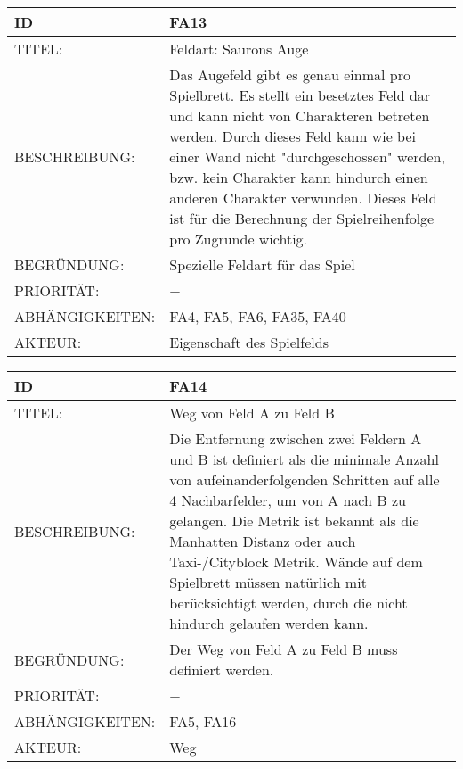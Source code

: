 \documentclass{uulm-assignment}
\begin{document}
    \begin{tabularx}{\textwidth}{|l|X |} \hline
        \textbf{ID} & \textbf{FA13} \\
        \hline
        TITEL: & Feldart: Saurons Auge \\
        \hline
        BESCHREIBUNG: &  Das Augefeld gibt es genau einmal pro Spielbrett. Es stellt ein besetztes Feld dar und kann nicht von Charakteren betreten werden. Durch dieses Feld kann
wie bei einer Wand nicht "durchgeschossen" werden, bzw. kein Charakter kann
hindurch einen anderen Charakter verwunden. Dieses Feld ist für die Berechnung
der Spielreihenfolge pro Zugrunde wichtig.
        \\
        \hline
        BEGRÜNDUNG: & Spezielle Feldart für das Spiel\\
        \hline
        PRIORITÄT: & +\\
        \hline
        ABHÄNGIGKEITEN: & FA4, FA5, FA6, FA35, FA40\\
        \hline
        AKTEUR: & Eigenschaft des Spielfelds
        \\
        \hline
    \end{tabularx}
    
    \begin{tabularx}{\textwidth}{|l|X |} \hline
        \textbf{ID} & \textbf{FA14} \\
        \hline
        TITEL: &  Weg von Feld A zu Feld B\\
        \hline
        BESCHREIBUNG: & Die Entfernung zwischen zwei Feldern A und B ist definiert als die minimale Anzahl von aufeinanderfolgenden Schritten auf alle 4 Nachbarfelder, um von A nach B zu gelangen. Die Metrik ist bekannt als die Manhatten Distanz oder auch Taxi-/Cityblock Metrik. Wände auf dem Spielbrett müssen natürlich mit berücksichtigt werden, durch die nicht hindurch gelaufen werden kann.
        \\
        \hline
        BEGRÜNDUNG: & Der Weg von Feld A zu Feld B muss definiert werden.\\
        \hline
        PRIORITÄT: & +\\
        \hline
        ABHÄNGIGKEITEN: & FA5, FA16 \\
        \hline
        AKTEUR: & Weg\\
        \hline
    \end{tabularx}
    
\end{document}
